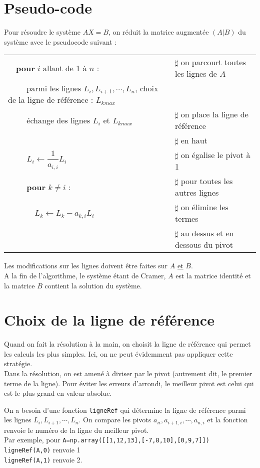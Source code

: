 \section{Pseudo-code}
\noindent Pour r\' esoudre le syst\` eme $AX=B$, on r\' eduit la matrice augment\' ee $(A|B)$ du syst\` eme avec le pseudocode suivant :\medskip \\
\begin{tabular}{ll}
$\quad$\textbf{pour} $i$ allant de 1 \` a $n$ : & $\sharp$ on parcourt toutes les lignes de $A$\\
$\quad\quad$ parmi les lignes $L_i,L_{i+1},\cdots ,L_{n}$, choix de la ligne de r\' ef\' erence : $L_{kmax}$\\
$\quad\quad$ \' echange des lignes $L_i$ et $L_{kmax}$  & $\sharp$  on place la ligne de r\' ef\' erence \\
 & $\sharp$ en haut \\
$\quad\quad$ $L_i\leftarrow \dfrac{1}{a_{i,i}}L_i$ & $\sharp$ on \' egalise le pivot \` a 1 \\
$\quad\quad$ \textbf{pour} $k\neq i$ : & $\sharp$ pour toutes les autres lignes \\
$\quad\quad\quad$ $L_k \leftarrow L_k-a_{k,i}L_i$ & $\sharp$  on \' elimine les termes \\
 & $\sharp$ au dessus et en dessous du pivot
\end{tabular}

\begin{remark}
Les modifications sur les lignes doivent \^ etre faites sur $A$ \underline{et} $B$. \\
A la fin de l'algorithme, le syst\` eme \' etant de Cramer, $A$ est la matrice identit\' e et la matrice $B$ contient la solution du syst\` eme.
\end{remark}


\section{Choix de la ligne de r\' ef\' erence}
\noindent Quand on fait la r\' esolution \` a la main, on choisit la ligne de r\' ef\' erence qui permet les calculs les plus simples. Ici, on ne peut \' evidemment pas appliquer cette strat\' egie. \\
Dans la r\' esolution, on est amen\' e \` a diviser par le pivot (autrement dit, le premier terme de la ligne). Pour \' eviter les erreurs d'arrondi, le meilleur pivot est celui qui est le plus grand en valeur absolue. \bigskip

On a besoin d'une fonction \verb?ligneRef? qui d\' etermine la ligne de r\' ef\' erence parmi les lignes $L_i,L_{i+1},\cdots,L_{n}$. On compare les pivots $a_{ii},a_{i+1,i},\cdots,a_{n,i}$ et la fonction renvoie le num\' ero de la ligne du meilleur pivot.\\
Par exemple, pour \verb?A=np.array([[1,12,13],[-7,8,10],[0,9,7]])?\\
\verb?ligneRef(A,0)? renvoie 1\\
\verb?ligneRef(A,1)? renvoie 2.

